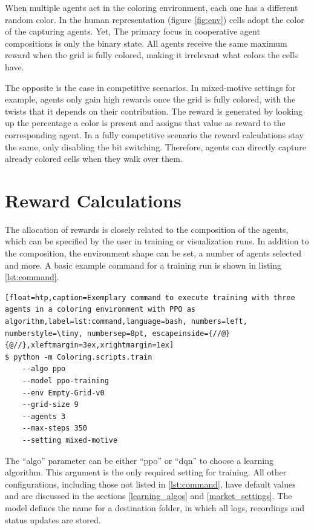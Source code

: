When multiple agents act in the coloring environment, each one has a different random color. In the human representation (figure \ref{fig:env}) cells adopt the color of the capturing agents. Yet, The primary focus in cooperative agent compositions is only the binary state. All agents receive the same maximum reward when the grid is fully colored, making it irrelevant what colors the cells have.

The opposite is the case in competitive scenarios. In mixed-motive settings for example, agents only gain high rewards once the grid is fully colored, with the twists that it depends on their contribution. The reward is generated by looking up the percentage a color is present and assigns that value as reward to the corresponding agent. In a fully competitive scenario the reward calculations stay the same, only disabling the bit switching. Therefore, agents can directly capture already colored cells when they walk over them.

\section{Reward Calculations}
The allocation of rewards is closely related to the composition of the agents, which can be specified by the user in training or visualization runs. In addition to the composition, the environment shape can be set, a number of agents selected and more. A basic example command for a training run is shown in listing \ref{lst:command}.

\begin{lstlisting}[float=htp,caption=Exemplary command to execute training with three agents in a coloring environment with PPO as algorithm,label=lst:command,language=bash, numbers=left, numberstyle=\tiny, numbersep=8pt, escapeinside={//@}{@//},xleftmargin=3ex,xrightmargin=1ex]
$ python -m Coloring.scripts.train
    --algo ppo
    --model ppo-training
    --env Empty-Grid-v0 
    --grid-size 9 
    --agents 3 
    --max-steps 350
    --setting mixed-motive
\end{lstlisting}

The ``algo'' parameter can be either ``ppo'' or ``dqn'' to choose a learning algorithm. This argument is the only required setting for training. All other configurations, including those not listed in \ref{lst:command}, have default values and are discussed in the sections \ref{learning_algos} and \ref{market_settings}. The model defines the name for a destination folder, in which all logs, recordings and status updates are stored.

